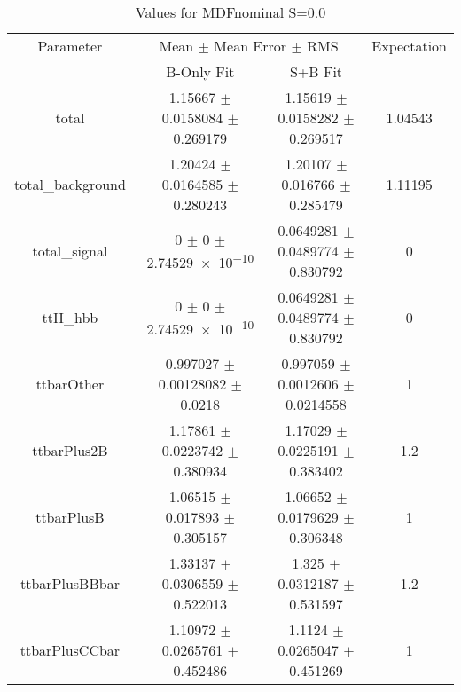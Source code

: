 \begin{table}
\centering
\caption{Values for MDFnominal S=0.0}
\begin{tabular}{cccc}
\toprule
Parameter & \multicolumn{2}{c}{Mean $\pm$ Mean Error $\pm$ RMS} & Expectation\\
 & B-Only Fit & S+B Fit & \\
\midrule
total & \num{1.15667} $\pm$ \num{0.0158084} $\pm$ \num{0.269179} & \num{1.15619} $\pm$ \num{0.0158282} $\pm$ \num{0.269517} & \num{1.04543}\\
total\_background & \num{1.20424} $\pm$ \num{0.0164585} $\pm$ \num{0.280243} & \num{1.20107} $\pm$ \num{0.016766} $\pm$ \num{0.285479} & \num{1.11195}\\
total\_signal & \num{0} $\pm$ \num{0} $\pm$ \num{2.74529e-10} & \num{0.0649281} $\pm$ \num{0.0489774} $\pm$ \num{0.830792} & \num{0}\\
ttH\_hbb & \num{0} $\pm$ \num{0} $\pm$ \num{2.74529e-10} & \num{0.0649281} $\pm$ \num{0.0489774} $\pm$ \num{0.830792} & \num{0}\\
ttbarOther & \num{0.997027} $\pm$ \num{0.00128082} $\pm$ \num{0.0218} & \num{0.997059} $\pm$ \num{0.0012606} $\pm$ \num{0.0214558} & \num{1}\\
ttbarPlus2B & \num{1.17861} $\pm$ \num{0.0223742} $\pm$ \num{0.380934} & \num{1.17029} $\pm$ \num{0.0225191} $\pm$ \num{0.383402} & \num{1.2}\\
ttbarPlusB & \num{1.06515} $\pm$ \num{0.017893} $\pm$ \num{0.305157} & \num{1.06652} $\pm$ \num{0.0179629} $\pm$ \num{0.306348} & \num{1}\\
ttbarPlusBBbar & \num{1.33137} $\pm$ \num{0.0306559} $\pm$ \num{0.522013} & \num{1.325} $\pm$ \num{0.0312187} $\pm$ \num{0.531597} & \num{1.2}\\
ttbarPlusCCbar & \num{1.10972} $\pm$ \num{0.0265761} $\pm$ \num{0.452486} & \num{1.1124} $\pm$ \num{0.0265047} $\pm$ \num{0.451269} & \num{1}\\
\bottomrule
\end{tabular}
\end{table}